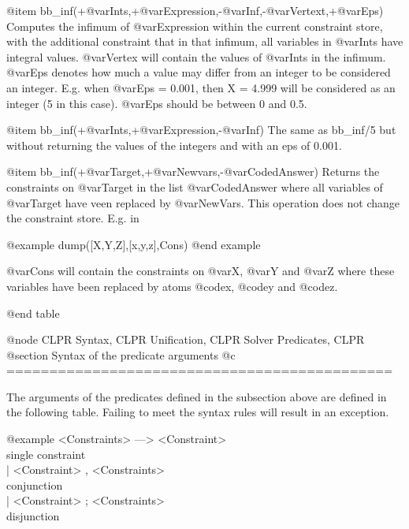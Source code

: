 	@item bb_inf(+@var{Ints},+@var{Expression},-@var{Inf},-@var{Vertext},+@var{Eps})
Computes the infimum of @var{Expression} within the current constraint
store, with the additional constraint that in that infimum, all
variables in @var{Ints} have integral values. @var{Vertex} will contain
the values of @var{Ints} in the infimum. @var{Eps} denotes how much a
value may differ from an integer to be considered an integer. E.g. when
@var{Eps} = 0.001, then X = 4.999 will be considered as an integer (5 in
this case). @var{Eps} should be between 0 and 0.5.

	@item bb_inf(+@var{Ints},+@var{Expression},-@var{Inf})
The same as bb_inf/5 but without returning the values of the integers
and with an eps of 0.001.

	@item bb_inf(+@var{Target},+@var{Newvars},-@var{CodedAnswer})
Returns the constraints on @var{Target} in the list @var{CodedAnswer}
where all variables of @var{Target} have veen replaced by @var{NewVars}.
This operation does not change the constraint store. E.g. in

@example
dump([X,Y,Z],[x,y,z],Cons)
@end example

@var{Cons} will contain the constraints on @var{X}, @var{Y} and
@var{Z} where these variables have been replaced by atoms @code{x}, @code{y} and @code{z}.
 
@end table

@node CLPR Syntax, CLPR Unification, CLPR Solver Predicates, CLPR
@section Syntax of the predicate arguments
@c =============================================

The arguments of the predicates defined in the subsection above are
defined in the following table. Failing to meet the syntax rules will
result in an exception.

@example
<Constraints> ---> <Constraint>				\\ single constraint \\
	      | <Constraint> , <Constraints>		\\ conjunction \\
	      | <Constraint> ; <Constraints>		\\ disjunction \\

